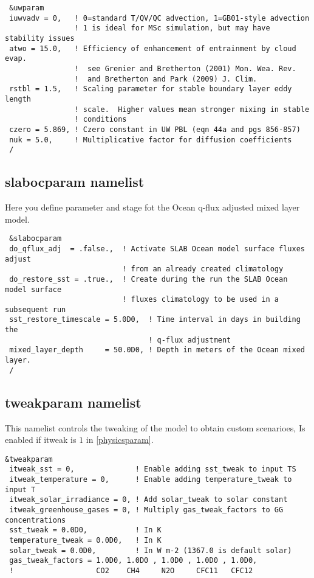 {\footnotesize
\begin{Verbatim}
 &uwparam
 iuwvadv = 0,   ! 0=standard T/QV/QC advection, 1=GB01-style advection
                ! 1 is ideal for MSc simulation, but may have stability issues
 atwo = 15.0,   ! Efficiency of enhancement of entrainment by cloud evap.
                !  see Grenier and Bretherton (2001) Mon. Wea. Rev.
                !  and Bretherton and Park (2009) J. Clim.
 rstbl = 1.5,   ! Scaling parameter for stable boundary layer eddy length
                ! scale.  Higher values mean stronger mixing in stable 
                ! conditions
 czero = 5.869, ! Czero constant in UW PBL (eqn 44a and pgs 856-857)
 nuk = 5.0,     ! Multiplicative factor for diffusion coefficients
 /
\end{Verbatim}
}

\subsection{slabocparam namelist}

Here you define parameter and stage fot the Ocean q-flux adjusted mixed layer
model.

{\footnotesize
\begin{Verbatim}
 &slabocparam
 do_qflux_adj  = .false.,  ! Activate SLAB Ocean model surface fluxes adjust
                           ! from an already created climatology
 do_restore_sst = .true.,  ! Create during the run the SLAB Ocean model surface
                           ! fluxes climatology to be used in a subsequent run
 sst_restore_timescale = 5.0D0,  ! Time interval in days in building the
                                 ! q-flux adjustment
 mixed_layer_depth     = 50.0D0, ! Depth in meters of the Ocean mixed layer.
 /
\end{Verbatim}
}

\subsection{tweakparam namelist}

This namelist controls the tweaking of the model to obtain custom scenarioes,
Is enabled if itweak is $1$ in \ref{physicsparam}.

{\footnotesize
\begin{Verbatim}
&tweakparam
 itweak_sst = 0,              ! Enable adding sst_tweak to input TS
 itweak_temperature = 0,      ! Enable adding temperature_tweak to input T
 itweak_solar_irradiance = 0, ! Add solar_tweak to solar constant
 itweak_greenhouse_gases = 0, ! Multiply gas_tweak_factors to GG concentrations
 sst_tweak = 0.0D0,           ! In K
 temperature_tweak = 0.0D0,   ! In K
 solar_tweak = 0.0D0,         ! In W m-2 (1367.0 is default solar)
 gas_tweak_factors = 1.0D0, 1.0D0 , 1.0D0 , 1.0D0 , 1.0D0,
 !                   CO2    CH4     N2O     CFC11   CFC12
\end{Verbatim}
}



